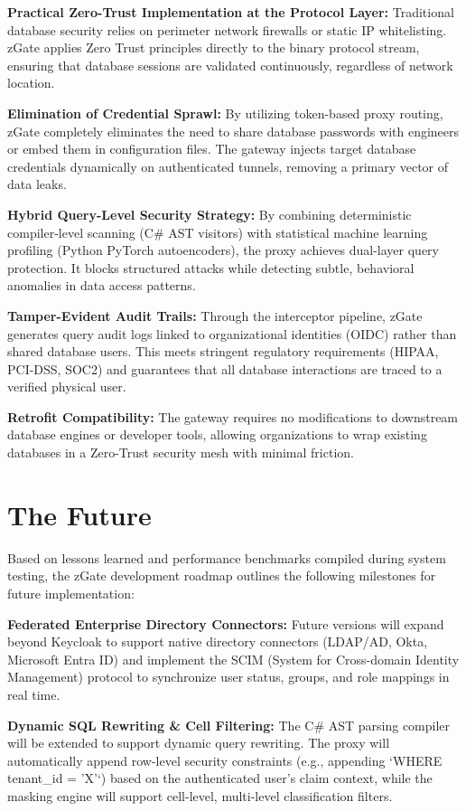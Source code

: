 \textbf{Practical Zero-Trust Implementation at the Protocol Layer:} Traditional database security relies on perimeter network firewalls or static IP whitelisting. zGate applies Zero Trust principles directly to the binary protocol stream, ensuring that database sessions are validated continuously, regardless of network location.

\textbf{Elimination of Credential Sprawl:} By utilizing token-based proxy routing, zGate completely eliminates the need to share database passwords with engineers or embed them in configuration files. The gateway injects target database credentials dynamically on authenticated tunnels, removing a primary vector of data leaks.

\textbf{Hybrid Query-Level Security Strategy:} By combining deterministic compiler-level scanning (C\# AST visitors) with statistical machine learning profiling (Python PyTorch autoencoders), the proxy achieves dual-layer query protection. It blocks structured attacks while detecting subtle, behavioral anomalies in data access patterns.

\textbf{Tamper-Evident Audit Trails:} Through the interceptor pipeline, zGate generates query audit logs linked to organizational identities (OIDC) rather than shared database users. This meets stringent regulatory requirements (HIPAA, PCI-DSS, SOC2) and guarantees that all database interactions are traced to a verified physical user.

\textbf{Retrofit Compatibility:} The gateway requires no modifications to downstream database engines or developer tools, allowing organizations to wrap existing databases in a Zero-Trust security mesh with minimal friction.

\section{The Future}

Based on lessons learned and performance benchmarks compiled during system testing, the zGate development roadmap outlines the following milestones for future implementation:

\textbf{Federated Enterprise Directory Connectors:}
Future versions will expand beyond Keycloak to support native directory connectors (LDAP/AD, Okta, Microsoft Entra ID) and implement the SCIM (System for Cross-domain Identity Management) protocol to synchronize user status, groups, and role mappings in real time.

\textbf{Dynamic SQL Rewriting \& Cell Filtering:}
The C\# AST parsing compiler will be extended to support dynamic query rewriting. The proxy will automatically append row-level security constraints (e.g., appending `WHERE tenant\_id = 'X'`) based on the authenticated user's claim context, while the masking engine will support cell-level, multi-level classification filters.


